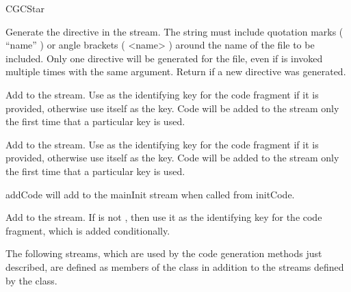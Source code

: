 \begin{indexlist}{CGCStar}

Generate the directive  in the
 stream.  The string
 must include quotation marks ( ``name'' ) or angle brackets
( <name> ) around the name of the file to be included.  Only one
 directive will be generated for the file,
even if  is invoked multiple times with the same
argument.  Return  if a new directive was generated.

Add  to the  stream.  Use  as the identifying key for the code
fragment if it is provided, otherwise use  itself as the
key.  Code will be added to the stream only the first time that a
particular key is used.

Add  to the  stream.  Use  as the identifying key for the code
fragment if it is provided, otherwise use  itself as the
key.  Code will be added to the stream only the first time that a
particular key is used.

\begin{ignore}
\comment addCode will add to the mainInit stream when called from initCode.

Add  to the 
stream.  If  is not , then use it as the
identifying key for the code fragment, which is added conditionally.

\end{ignore}

\end{indexlist}

The following streams, which are used by the code generation methods
just described, are defined as members of the
 class in addition to the
streams defined by the  class.

